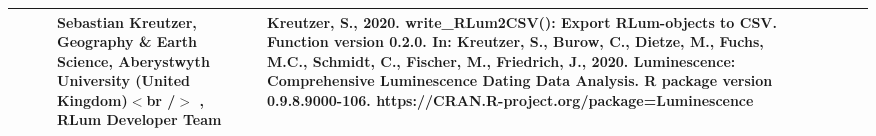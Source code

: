 \begin{table}[ht]
\begin{tabular}{rllllllll}
 &  &  & Sebastian Kreutzer, Geography \& Earth Science, Aberystwyth University (United Kingdom)$<$br /$>$ , RLum Developer Team & Kreutzer, S., 2020. write\_RLum2CSV(): Export RLum-objects to CSV. Function version 0.2.0. In: Kreutzer, S., Burow, C., Dietze, M., Fuchs, M.C., Schmidt, C., Fischer, M., Friedrich, J., 2020. Luminescence: Comprehensive Luminescence Dating Data Analysis. R package version 0.9.8.9000-106. https://CRAN.R-project.org/package=Luminescence
 \\ 
   \hline
\end{tabular}
\end{table}

